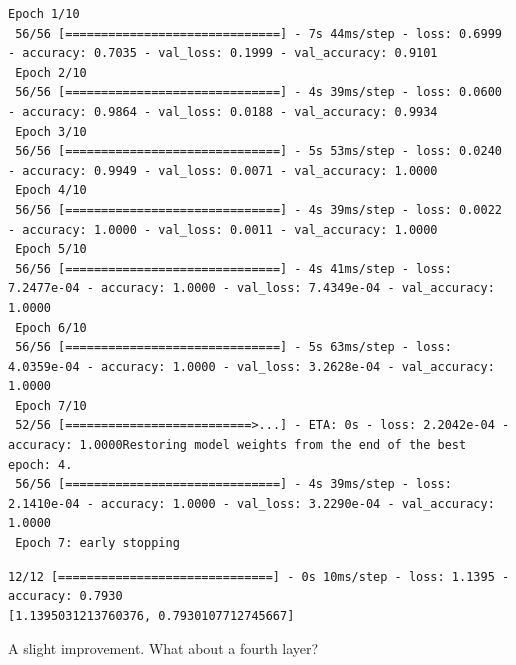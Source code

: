 \documentclass{article}
\begin{document}
\begin{lstlisting}[style=output]
 Epoch 1/10
 56/56 [==============================] - 7s 44ms/step - loss: 0.6999 - accuracy: 0.7035 - val_loss: 0.1999 - val_accuracy: 0.9101
 Epoch 2/10
 56/56 [==============================] - 4s 39ms/step - loss: 0.0600 - accuracy: 0.9864 - val_loss: 0.0188 - val_accuracy: 0.9934
 Epoch 3/10
 56/56 [==============================] - 5s 53ms/step - loss: 0.0240 - accuracy: 0.9949 - val_loss: 0.0071 - val_accuracy: 1.0000
 Epoch 4/10
 56/56 [==============================] - 4s 39ms/step - loss: 0.0022 - accuracy: 1.0000 - val_loss: 0.0011 - val_accuracy: 1.0000
 Epoch 5/10
 56/56 [==============================] - 4s 41ms/step - loss: 7.2477e-04 - accuracy: 1.0000 - val_loss: 7.4349e-04 - val_accuracy: 1.0000
 Epoch 6/10
 56/56 [==============================] - 5s 63ms/step - loss: 4.0359e-04 - accuracy: 1.0000 - val_loss: 3.2628e-04 - val_accuracy: 1.0000
 Epoch 7/10
 52/56 [==========================>...] - ETA: 0s - loss: 2.2042e-04 - accuracy: 1.0000Restoring model weights from the end of the best epoch: 4.
 56/56 [==============================] - 4s 39ms/step - loss: 2.1410e-04 - accuracy: 1.0000 - val_loss: 3.2290e-04 - val_accuracy: 1.0000
 Epoch 7: early stopping
\end{lstlisting}



\begin{lstlisting}[style=output]
12/12 [==============================] - 0s 10ms/step - loss: 1.1395 - accuracy: 0.7930
[1.1395031213760376, 0.7930107712745667]
\end{lstlisting}

A slight improvement. What about a fourth layer?


\end{document}
